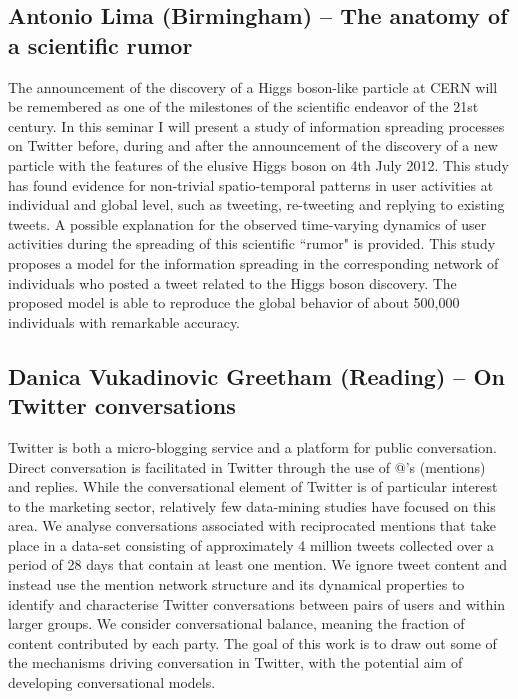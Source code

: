 \documentclass[10pt]{article}
\begin{document}
\begin{multicols}{2}
\subsection*{Antonio Lima (Birmingham) – The anatomy of a scientific rumor}

The announcement of the discovery of a Higgs boson-like particle at CERN will be remembered as one of the milestones of the scientific endeavor of the 21st century. In this seminar I will present a study of information spreading processes on Twitter before, during and after the announcement of the discovery of a new particle with the features of the elusive Higgs boson on 4th July 2012. This study has found evidence for non-trivial spatio-temporal patterns in user activities at individual and global level, such as tweeting, re-tweeting and replying to existing tweets. A possible explanation for the observed time-varying dynamics of user activities during the spreading of this scientific ``rumor" is provided. This study proposes a model for the information spreading in the corresponding network of individuals who posted a tweet related to the Higgs boson discovery. The proposed model is able to reproduce the global behavior of about 500,000 individuals with remarkable accuracy.

\subsection*{Danica Vukadinovic Greetham (Reading) – On Twitter conversations}

Twitter is both a micro-blogging service and a platform for public conversation. Direct conversation is facilitated in Twitter through the use of @’s (mentions) and replies. While the conversational element of Twitter is of particular interest to the marketing sector, relatively few data-mining studies have focused on this area. We analyse conversations associated with reciprocated mentions that take place in a data-set consisting of approximately 4 million tweets collected over a period of 28 days that contain at least one mention. We ignore tweet content and instead use the mention network structure and its dynamical properties to identify and characterise Twitter conversations between pairs of users and within larger groups. We consider conversational balance, meaning the fraction of content contributed by each party. The goal of this work is to draw out some of the mechanisms driving conversation in Twitter, with the potential aim of developing conversational models.


\end{multicols}
\end{document}
